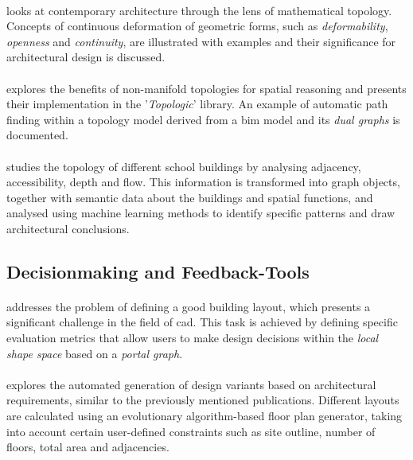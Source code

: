 \documentclass[a4paper, 12pt]{report}
\begin{document}
\paragraph{\cite{lojanica12018topological}} looks at contemporary architecture through the lens of mathematical topology. Concepts of continuous deformation of geometric forms, such as \textit{deformability}, \textit{openness} and \textit{continuity}, are illustrated with examples and their significance for architectural design is discussed.

\paragraph{\cite{wardhana2019spatial}} explores the benefits of non-\gls{manifold} topologies for spatial reasoning and presents their implementation in the '\textit{Topologic}' library. An example of automatic path finding within a topology model derived from a \acrshort{bim} model and its \textit{dual graphs} is documented.

\paragraph{\cite{bielski2020topological}} studies the topology of different school buildings by analysing adjacency, accessibility, depth and flow. This information is transformed into graph objects, together with semantic data about the buildings and spatial functions, and analysed using machine learning methods to identify specific patterns and draw architectural conclusions.

\subsection*{Decisionmaking and Feedback-Tools}\label{subsec:decisionmaking-and-feedback-tools-fr}

\paragraph{\cite{bao2013generating}} addresses the problem of defining a good building layout, which presents a significant challenge in the field of \acrshort{cad}. This task is achieved by defining specific evaluation metrics that allow users to make design decisions within the \textit{local shape space} based on a \textit{portal graph}.

\paragraph{\cite{das2016space}} explores the automated generation of design variants based on architectural requirements, similar to the previously mentioned publications. Different layouts are calculated using an evolutionary algorithm-based floor plan generator, taking into account certain user-defined constraints such as site outline, number of floors, total area and adjacencies.
\end{document}
